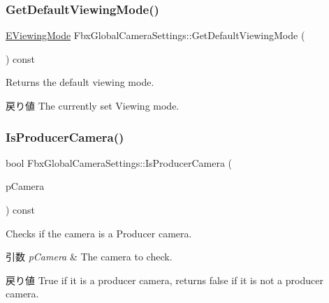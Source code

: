 \subsubsection{\texorpdfstring{Get\+Default\+Viewing\+Mode()}{GetDefaultViewingMode()}}
{\footnotesize\ttfamily \hyperlink{class_fbx_global_camera_settings_aaa674f8b39e4cd57d7cc07f381f11858}{E\+Viewing\+Mode} Fbx\+Global\+Camera\+Settings\+::\+Get\+Default\+Viewing\+Mode (\begin{DoxyParamCaption}{ }\end{DoxyParamCaption}) const}

Returns the default viewing mode. \begin{DoxyReturn}{戻り値}
The currently set Viewing mode. 
\end{DoxyReturn}
\mbox{\label{class_fbx_global_camera_settings_abcabe0a434ecb96f58711e16f6f7abc5}} 
\subsubsection{\texorpdfstring{Is\+Producer\+Camera()}{IsProducerCamera()}}
{\footnotesize\ttfamily bool Fbx\+Global\+Camera\+Settings\+::\+Is\+Producer\+Camera (\begin{DoxyParamCaption}\item[{\hyperlink{class_fbx_camera}{Fbx\+Camera} $\ast$}]{p\+Camera }\end{DoxyParamCaption}) const}

Checks if the camera is a Producer camera. 
\begin{DoxyParams}{引数}
{\em p\+Camera} & The camera to check. \\
\hline
\end{DoxyParams}
\begin{DoxyReturn}{戻り値}
{\ttfamily True} if it is a producer camera, returns {\ttfamily false} if it is not a producer camera. 
\end{DoxyReturn}
\mbox{\label{class_fbx_global_camera_settings_aaee942061eedeb6b7e1bae058b1d3ddd}} 
